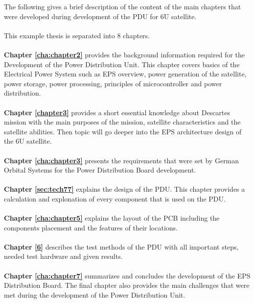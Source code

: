 The following gives a brief description of the content of the main chapters that were developed during development of the PDU for 6U satellite.
\\
\\
\noindent This example thesis is separated into 8 chapters.
\\
\\
\textbf{Chapter \ref{cha:chapter2}} provides the background information required for the Development of the Power Distribution Unit. This chapter covers basics of the Electrical Power System such as EPS overview, power generation of the satellite, power storage, power processing, principles of microcontroller and power distribution.
\\
\\
\textbf{Chapter \ref{chapter3}} provides a short essential knowledge about Descartes mission with the main purposes of the mission, satellite characteristics and the satellite  abilities. Then topic will go deeper into the EPS architecture design of the 6U satellite.
\\
\\
\textbf{Chapter \ref{cha:chapter3}} presents the requirements that were set by German Orbital Systems for the Power Distribution Board development.
\\
\\
\textbf{Chapter \ref{sec:tech77}} explains the design of the PDU. This chapter provides a calculation and explonation of every component that is used on the PDU. 
\\
\\
\textbf{Chapter \ref{cha:chapter5}} explains the layout of the PCB including the components placement and the features of their locations.
\\
\\
\textbf{Chapter \ref{6}} describes the test methods of the PDU with all important steps, needed test hardware and given results.
\\
\\
\textbf{Chapter \ref{cha:chapter7}} summarizes and concludes the development of the EPS Distribution Board. The final chapter also provides the main challenges that were met during the development of the Power Distribution Unit.